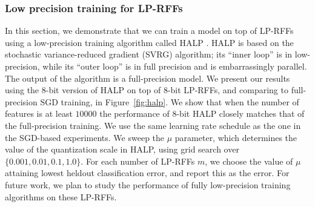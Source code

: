 \begin{table}[ht]
\begin{minipage}{0.4\linewidth}
	\caption{Low-precision training on TIMIT using 8-bit HALP on 8-bit LP-RFFs, relative to full-precision SGD.
	}	
	\label{fig:halp}
\end{minipage}
\end{table}



\subsubsection{Low precision training for LP-RFFs}
\label{sec:halp}
In this section, we demonstrate that we can train a model on top of LP-RFFs using a low-precision training algorithm called HALP \citep{halp18}. HALP is based on the stochastic variance-reduced gradient (SVRG) algorithm; its ``inner loop'' is in low-precision, while its ``outer loop'' is in full precision and is embarrassingly parallel. The output of the algorithm is a full-precision model.  We present our results using the 8-bit version of HALP on top of 8-bit LP-RFFs, and comparing to full-precision SGD training, in Figure~\ref{fig:halp}. We show that when the number of features is at least $\num[group-separator={,}]{10000}$ the performance of 8-bit HALP closely matches that of the full-precision training. We use the same learning rate schedule as the one in the SGD-based experiments. We sweep the $\mu$ parameter, which determines the value of the quantization scale in HALP, using grid search over $\{0.001, 0.01, 0.1, 1.0\}$. For each number of LP-RFFs $m$, we choose the value of $\mu$ attaining lowest heldout classification error, and report this as the error. For future work, we plan to study the performance of fully low-precision training algorithms on these LP-RFFs.


